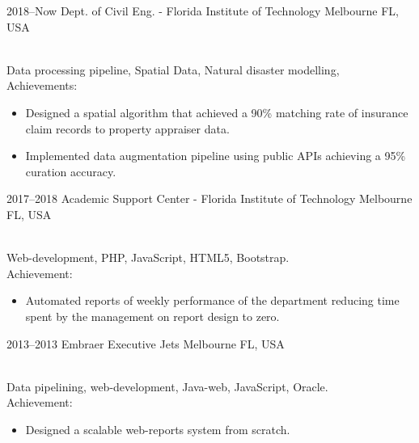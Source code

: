 \documentclass[]{cv-style}          %
\begin{document}
\begin{entrylist}
\entry
  {2018--Now}
  {Dept. of Civil Eng. - Florida Institute of Technology}
  {Melbourne FL, USA}
  {\\
  Data processing pipeline, Spatial Data, Natural disaster modelling, \\
    Achievements:
  \begin{itemize}
    \item Designed a spatial algorithm that achieved a 90\% matching rate of insurance claim records to property appraiser data.
    \item Implemented data augmentation pipeline using public APIs achieving a 95\% curation accuracy.
  \end{itemize}}
\entry
  {2017--2018}
  {Academic Support Center - Florida Institute of Technology}
  {Melbourne FL, USA}
  {\\
  Web-development, PHP, JavaScript, HTML5, Bootstrap.\\
  Achievement:
  \begin{itemize}
    \item Automated reports of weekly performance of the department reducing time spent by the management on report design to zero.
  \end{itemize}}
\entry
  {2013--2013}
  {Embraer Executive Jets}
  {Melbourne FL, USA}
  {\\
  Data pipelining, web-development, Java-web, JavaScript,  Oracle.\\
  Achievement:
  \begin{itemize}
    \item Designed a scalable web-reports system from scratch.
  \end{itemize}}
\end{entrylist}

\vspace{-.5cm}
\end{document}
